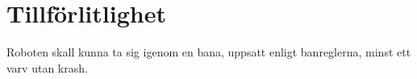 \section{Tillförlitlighet}
Roboten skall kunna ta sig igenom en bana, uppsatt enligt banreglerna, minst ett varv utan krash.